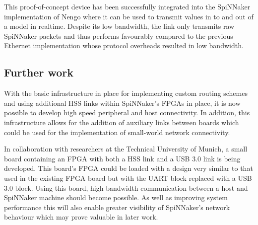 				This proof-of-concept device has been successfully integrated into the
				SpiNNaker implementation of Nengo where it can be used to transmit
				values in to and out of a model in realtime. Despite its low bandwidth,
				the link only transmits raw SpiNNaker packets and thus performs
				favourably compared to the previous Ethernet implementation whose
				protocol overheads resulted in low bandwidth.
			
			\subsection{Further work}
				
				
				With the basic infrastructure in place for implementing custom routing
				schemes and using additional HSS links within SpiNNaker's FPGAs in
				place, it is now possible to develop high speed peripheral and host
				connectivity. In addition, this infrastructure allows for the addition
				of auxiliary links between boards which could be used for the
				implementation of small-world network connectivity.
				
				In collaboration with researchers at the Technical University of Munich,
				a small board containing an FPGA with both a HSS link and a USB 3.0 link
				is being developed. This board's FPGA could be loaded with a design very
				similar to that used in the existing FPGA board but with the UART block
				replaced with a USB 3.0 block. Using this board, high bandwidth
				communication between a host and SpiNNaker machine should become
				possible. As well as improving system performance this will also enable
				greater visibility of SpiNNaker's network behaviour which may prove
				valuable in later work.

